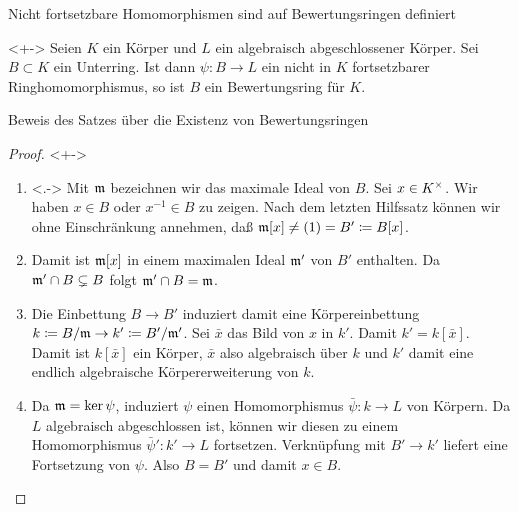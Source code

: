 \begin{frame}{Nicht fortsetzbare Homomorphismen sind auf Bewertungsringen
	definiert}
	\begin{theorem}<+->
		\label{thm:existence_of_valuation_rings}
		Seien \(K\) ein Körper und \(L\) ein algebraisch abgeschlossener Körper.
		Sei \(B \subset K\) ein Unterring. Ist dann \(\psi\colon B \to L\)
		ein nicht in \(K\) fortsetzbarer Ringhomomorphismus, so ist \(B\) ein
		Bewertungsring für \(K\).
	\end{theorem}
\end{frame}

\begin{frame}{Beweis des Satzes über die Existenz von Bewertungsringen}
	\begin{proof}<+->
		\begin{enumerate}[<+->]
		\item<.->
			Mit \(\mathfrak{m}\) bezeichnen wir das maximale Ideal von \(B\).
			Sei \(x \in K^\times\). Wir haben \(x \in B\) oder \(x^{-1} \in B\)
			zu zeigen. Nach dem letzten Hilfssatz können wir ohne Einschränkung
			annehmen, daß \(\mathfrak{m}[x] \neq (1) = B' \coloneqq B[x]\).
		\item
			Damit ist \(\mathfrak{m}[x]\) in einem maximalen Ideal \(\mathfrak{m}'\) von
			\(B'\) enthalten. Da \(\mathfrak{m}' \cap B \subsetneq B\)
			folgt \(\mathfrak{m}' \cap B = \mathfrak{m}\).
		\item
			Die Einbettung \(B \to B'\) induziert damit eine Körpereinbettung
			\(k \coloneqq B/\mathfrak{m} \to k' \coloneqq B'/\mathfrak{m}'\).
			Sei \(\bar x\) das Bild von \(x\) in \(k'\). Damit
			\(k' = k[\bar x]\). Damit ist \(k[\bar x]\) ein Körper, \(\bar x\) also
			algebraisch über \(k\) und \(k'\) damit eine endlich algebraische
			Körpererweiterung von \(k\).
		\item
			Da \(\mathfrak{m} = \ker \psi\), induziert \(\psi\) einen Homomorphismus
			\(\bar\psi\colon k \to L\) von Körpern. Da \(L\) algebraisch
			abgeschlossen ist, können wir diesen zu einem Homomorphismus
			\(\bar\psi'\colon k' \to L\) fortsetzen. Verknüpfung mit
			\(B' \to k'\) liefert eine Fortsetzung von \(\psi\). Also \(B = B'\)
			und damit \(x \in B\).
			\qedhere
		\end{enumerate}
	\end{proof}
\end{frame}

